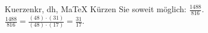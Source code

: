 \begin{MAufgabe}{Kuerzen}{kr, dh, MaTeX}
K\"urzen Sie soweit m\"oglich: $\frac{1488}{816}$.\\ 
\ifLsg\MLoesung
\quad $\frac{1488}{816}=\frac{(48)\cdot(31)}{(48)\cdot(17)}=\frac{31}{17}$.\else\relax\fi
 \end{MAufgabe}